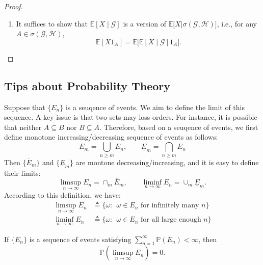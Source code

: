\begin{proof}
\begin{enumerate}
\item
It suffices to show that $\mathbb{E}[X\mid\mathcal{G}]$ is a version of $\mathbb{E}\bigg[
X\bigg|
\sigma(\mathcal{G},\mathcal{H})
\bigg]$, i.e., for any $A\in\sigma(\mathcal{G},\mathcal{H})$,
\[
\mathbb{E}[X1_A]
=
\mathbb{E}
\bigg[
\mathbb{E}[X\mid\mathcal{G}]1_A
\bigg].
\]
\end{enumerate}
\end{proof}

\subsection{Tips about Probability Theory}
Suppose that $\{E_n\}$ is a seuqence of events.
We aim to define the limit of this sequence. 
A key issue is that two sets may loss orders. For instance, it is possible that neither $A\subseteq B$ nor $B\subseteq A$.
Therefore, based on a seuqence of events, we first define monotone increasing/decreasing sequence of events as follows:
\[
\overline{E}_m = \bigcup_{n\ge m}E_n,\qquad
\underline{E}_m = \bigcap_{n\ge m}E_n
\]
Then $\{\overline{E}_m\}$ and $\{\underline{E}_m\}$ are montone decreasing/increasing, and it is easy to define their limits:
\[
\limsup_{n\to\infty}E_n=\cap_{m}\overline{E}_m,\qquad
\liminf_{n\to\infty}E_n=\cup_m\underline{E}_m.
\]
According to this definition, we have:
\begin{align*}
\limsup_{n\to\infty}E_n&\triangleq 
\{\omega:~~\omega\in E_n\text{ for infinitely many $n$}\}\\
\liminf_{n\to\infty}E_n&\triangleq
\{\omega:~~\omega\in E_n\text{ for all large enough $n$}\}
\end{align*}


\begin{theorem}\label{The:BC}
If $\{E_n\}$ is a sequence of events satisfying 
$\sum_{n=1}^\infty\mathbb{P}(E_n)<\infty$, 
then
\[
\mathbb{P}\left(\limsup_{n\to\infty} E_n\right) = 0.
\]
\end{theorem}


